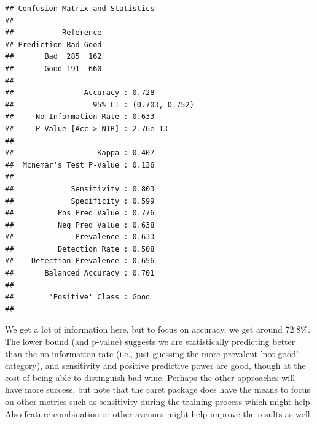 \documentclass[english,nohyper,titlepage]{tufte-handout}\usepackage{knitr}
\begin{document}
\begin{knitrout}\footnotesize
{}\color{fgcolor}\begin{kframe}
\begin{alltt}
 \hlkwb{=} \hlstd{(results_knn, wine_test[,}\hlopt{-}\hlstd{])}
\hlstd{(preds_knn, wine_test[,}\hlstd{],} \hlstd{=}\hlstd{)}
\end{alltt}
\begin{verbatim}
## Confusion Matrix and Statistics
## 
##           Reference
## Prediction Bad Good
##       Bad  285  162
##       Good 191  660
##                                         
##                Accuracy : 0.728         
##                  95% CI : (0.703, 0.752)
##     No Information Rate : 0.633         
##     P-Value [Acc > NIR] : 2.76e-13      
##                                         
##                   Kappa : 0.407         
##  Mcnemar's Test P-Value : 0.136         
##                                         
##             Sensitivity : 0.803         
##             Specificity : 0.599         
##          Pos Pred Value : 0.776         
##          Neg Pred Value : 0.638         
##              Prevalence : 0.633         
##          Detection Rate : 0.508         
##    Detection Prevalence : 0.656         
##       Balanced Accuracy : 0.701         
##                                         
##        'Positive' Class : Good          
## 
\end{verbatim}
\end{kframe}
\end{knitrout}


We get a lot of information here, but to focus on accuracy, we get around 72.8\%. The lower bound (and p-value) suggests we are statistically predicting better than the no information rate (i.e., just guessing the more prevalent 'not good' category), and sensitivity and positive predictive power are good, though at the cost of being able to distinguish bad wine.  Perhaps the other approaches will have more success, but note that the caret package does have the means to focus on other metrics such as sensitivity during the training process which might help.  Also feature combination or other avenues might help improve the results as well.
\end{document}
